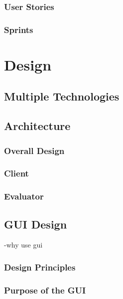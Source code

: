 \documentclass{l4proj}
\begin{document}
\subsection{User Stories}
\subsection{Sprints}

\chapter{Design}

\section{Multiple Technologies}



\section{Architecture}

\subsection{Overall Design}


\subsection{Client}


\subsection{Evaluator}


\section{GUI Design}
-why use gui
\subsection{Design Principles}

\subsection{Purpose of the GUI}
\end{document}
